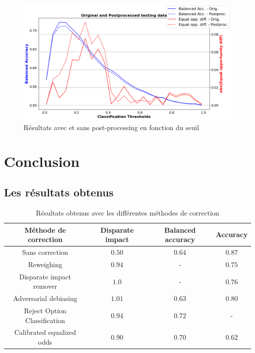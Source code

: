 \documentclass{article}
\begin{document}
    \begin{figure}[h]
        \centering
        \includegraphics[width=\textwidth]{./img/cal_equ_odds.png}
        \caption{Résultats avec et sans post-processing en fonction du seuil}
        \label{fig:EQU_odds}
    \end{figure}
    \vspace{3cm}

    \newpage
    \section{Conclusion}

    \subsection{Les résultats obtenus}
    \begin{center}
        \begin{table}[h]
            \begin{tabular}{ |c c c c| }
                \hline
                \textbf{Méthode de correction} & \textbf{Disparate impact} & \textbf{Balanced accuracy} & \textbf{Accuracy} \\
                \hline
                Sans correction & $0.50$ & $0.64$ & $0.87$ \\
                \hline
                Reweighing & $0.94$ & - & $0.75$ \\
                \hline
                Disparate impact remover & $1.0$ & - & $0.76$ \\
                \hline
                Adversarial debiasing & $1.01$ & $0.63$ & $0.80$ \\
                \hline
                Reject Option Classification & $0.94$ & $0.72$ & - \\
                \hline
                Calibrated equalized odds & $0.90$ & $0.70$ & $0.62$ \\
                \hline
            \end{tabular}
            \caption{Résultats obtenus avec les différentes méthodes de correction}
            \label{tab:results}
        \end{table}
        
    \end{center}
\end{document}
